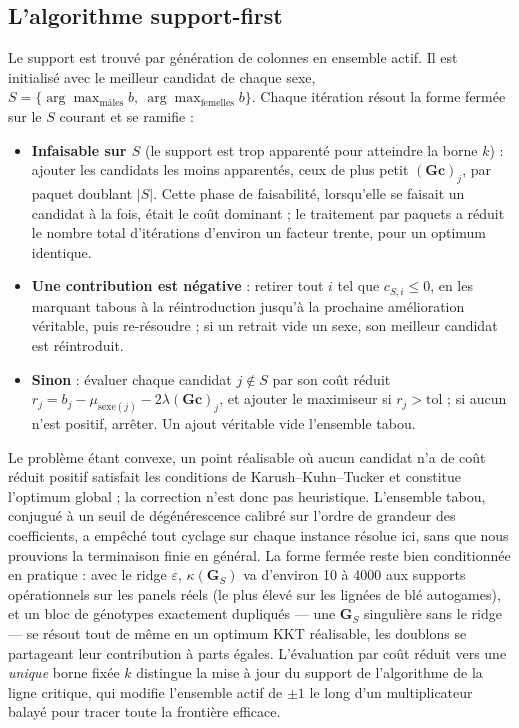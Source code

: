 \documentclass[11pt]{article}
\newcommand{\bc}{\mathbf{c}}
\newcommand{\bG}{\mathbf{G}}
\begin{document}
\subsection{L'algorithme support-first}

Le support est trouvé par génération de colonnes en ensemble actif. Il est initialisé avec le meilleur candidat de chaque sexe, $S=\{\arg\max_{\text{mâles}} b,\ \arg\max_{\text{femelles}} b\}$. Chaque itération résout la forme fermée sur le $S$ courant et se ramifie :

\begin{itemize}
\item \textbf{Infaisable sur $S$} (le support est trop apparenté pour atteindre la borne $k$) : ajouter les candidats les moins apparentés, ceux de plus petit $(\bG\bc)_j$, par paquet doublant $|S|$. Cette phase de faisabilité, lorsqu'elle se faisait un candidat à la fois, était le coût dominant ; le traitement par paquets a réduit le nombre total d'itérations d'environ un facteur trente, pour un optimum identique.
\item \textbf{Une contribution est négative} : retirer tout $i$ tel que $c_{S,i}\le0$, en les marquant tabous à la réintroduction jusqu'à la prochaine amélioration véritable, puis re-résoudre ; si un retrait vide un sexe, son meilleur candidat est réintroduit.
\item \textbf{Sinon} : évaluer chaque candidat $j\notin S$ par son coût réduit $r_j=b_j-\mu_{\text{sexe}(j)}-2\lambda(\bG\bc)_j$, et ajouter le maximiseur si $r_j>\text{tol}$ ; si aucun n'est positif, arrêter. Un ajout véritable vide l'ensemble tabou.
\end{itemize}

Le problème étant convexe, un point réalisable où aucun candidat n'a de coût réduit positif satisfait les conditions de Karush--Kuhn--Tucker et constitue l'optimum global ; la correction n'est donc pas heuristique. L'ensemble tabou, conjugué à un seuil de dégénérescence calibré sur l'ordre de grandeur des coefficients, a empêché tout cyclage sur chaque instance résolue ici, sans que nous prouvions la terminaison finie en général. La forme fermée reste bien conditionnée en pratique : avec le ridge $\varepsilon$, $\kappa(\bG_S)$ va d'environ 10 à 4000 aux supports opérationnels sur les panels réels (le plus élevé sur les lignées de blé autogames), et un bloc de génotypes exactement dupliqués --- une $\bG_S$ singulière sans le ridge --- se résout tout de même en un optimum KKT réalisable, les doublons se partageant leur contribution à parts égales. L'évaluation par coût réduit vers une \emph{unique} borne fixée $k$ distingue la mise à jour du support de l'algorithme de la ligne critique, qui modifie l'ensemble actif de $\pm1$ le long d'un multiplicateur balayé pour tracer toute la frontière efficace.
\end{document}
